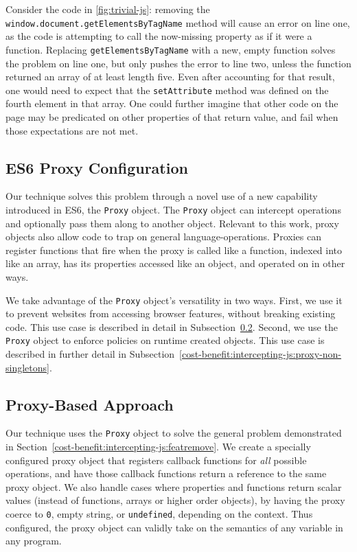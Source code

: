 

Consider the code in \ref{fig:trivial-js}:  removing the
\texttt{window.document.getElementsByTagName} method will cause an error
on line one, as the code is attempting to call the now-missing property as if
it were a function.  Replacing \texttt{getElementsByTagName} with a new, empty
function solves the problem on line one, but only pushes the error to line
two, unless the function returned an array of at least length five. Even after
accounting for that result, one would need to expect that the
\texttt{setAttribute} method was defined on the fourth element in that array.
One could further imagine that other code on the page may be predicated on
other properties of that return value, and fail when those expectations are not
met.


\subsection{ES6 Proxy Configuration}
Our technique solves this problem through a novel use of a new capability
introduced in ES6, the \texttt{Proxy} object.  The \texttt{Proxy} object can
intercept operations and optionally pass them along to another object.
Relevant to this work, proxy objects also allow code to trap on general
language-operations.  Proxies can register functions that fire when the
proxy is called like a function, indexed into like an array, has its properties
accessed like an object, and operated on in other ways.

We take advantage of the \texttt{Proxy} object's versatility in two ways.
First, we use it to prevent websites from accessing browser features,
without breaking existing code.  This use case is described in detail in
Subsection~\ref{cost-benefit:intercepting-js:proxy-general}.  Second, we
use the \texttt{Proxy} object to enforce policies on runtime created objects.
This use case is described in further detail in
Subsection~\ref{cost-benefit:intercepting-js:proxy-non-singletons}.


\subsection{Proxy-Based Approach}
\label{cost-benefit:intercepting-js:proxy-general}
Our technique uses the \texttt{Proxy} object to solve the general problem
demonstrated in Section~\ref{cost-benefit:intercepting-js:featremove}.  We
create a specially configured proxy object that registers callback functions
for \emph{all} possible \JS operations, and have those callback functions
return a reference to the same proxy object.  We also handle cases where \WAPI
properties and functions return scalar values (instead of functions, arrays
or higher order objects), by having the proxy coerce to \texttt{0},
empty string, or \texttt{undefined}, depending on the context. Thus configured,
the proxy object can validly take on the semantics of any variable in any \JS
program.

